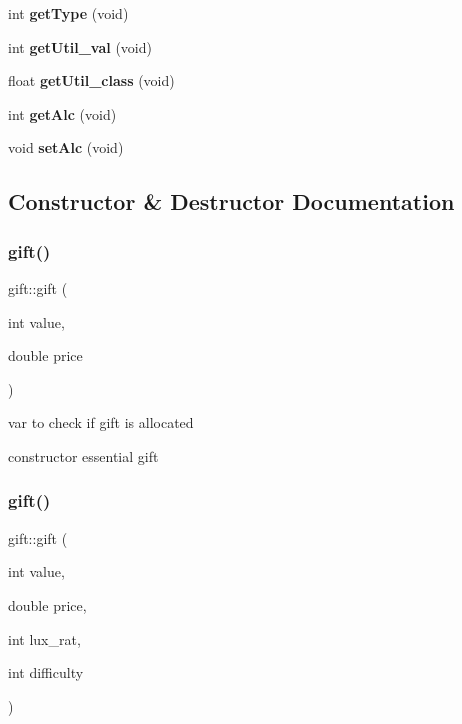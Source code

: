 \begin{DoxyCompactItemize}
\mbox{\label{classgift_a820ca25bbee4873ef9b0e82ca2f73ad3}} 
int {\bfseries get\+Type} (void)
\item 
\mbox{\label{classgift_a5e2d84e4d1fe8c00903a71195fc41487}} 
int {\bfseries get\+Util\+\_\+val} (void)
\item 
\mbox{\label{classgift_a2bb6e0ed9bb5c1f98d47660d39ebf3f8}} 
float {\bfseries get\+Util\+\_\+class} (void)
\item 
\mbox{\label{classgift_a35e47e5084f539114e84b7ce477d93e2}} 
int {\bfseries get\+Alc} (void)
\item 
\mbox{\label{classgift_a312e5d347516d8ea351e1127de8a28ce}} 
void {\bfseries set\+Alc} (void)
\end{DoxyCompactItemize}


\subsection{Constructor \& Destructor Documentation}
\mbox{\label{classgift_a782f5cf6316f6c76061b72cc12c6d95c}} 
\subsubsection{\texorpdfstring{gift()}{gift()}\hspace{0.1cm}{\footnotesize\ttfamily [1/3]}}
{\footnotesize\ttfamily gift\+::gift (\begin{DoxyParamCaption}\item[{int}]{value,  }\item[{double}]{price }\end{DoxyParamCaption})}



var to check if gift is allocated 

constructor essential gift \mbox{\label{classgift_a1de4cec7237a45096900754354d1edb6}} 
\subsubsection{\texorpdfstring{gift()}{gift()}\hspace{0.1cm}{\footnotesize\ttfamily [2/3]}}
{\footnotesize\ttfamily gift\+::gift (\begin{DoxyParamCaption}\item[{int}]{value,  }\item[{double}]{price,  }\item[{int}]{lux\+\_\+rat,  }\item[{int}]{difficulty }\end{DoxyParamCaption})}



